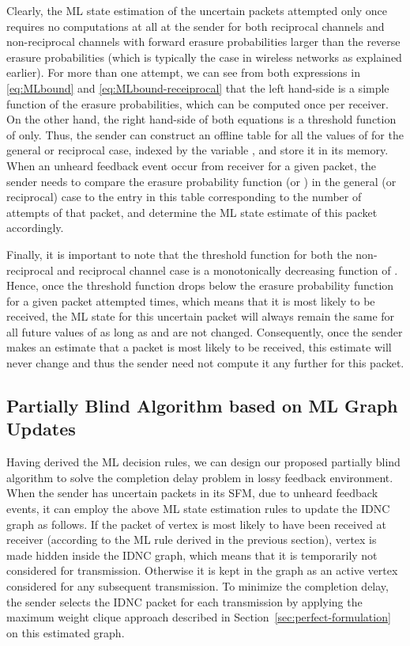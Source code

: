 \documentclass[10pt,jounral]{IEEEtran}
\newcommand{\sref}[1]{Section~\ref{#1}}
\newcommand{\ignore}[1]{}
\begin{document}
Clearly, the ML state estimation of the uncertain packets attempted only once requires no computations at all at the sender for both reciprocal channels and non-reciprocal channels with forward erasure probabilities larger than the reverse erasure probabilities (which is typically the case in wireless networks as explained earlier). For more than one attempt, we can see from both expressions in \eqref{eq:MLbound} and \eqref{eq:MLbound-receiprocal} that the left hand-side is a simple function of the erasure probabilities, which can be computed once per receiver. On the other hand, the right hand-side of both equations is a threshold function of  only. Thus, the sender can construct an offline table for all the values of \ignore{ } for the general or reciprocal case, indexed by the variable , and store it in its memory. When an unheard feedback event occur from receiver  for a given packet, the sender needs to compare the erasure probability function  (or ) in the general (or reciprocal) case to the entry in this table corresponding to the number of attempts of that packet, and determine the ML state estimate of this packet accordingly\ignore{to make the decision on updating the SFM and IDNC graph accordingly}.

Finally, it is important to note that the threshold function for both the non-reciprocal and reciprocal channel case is a monotonically decreasing function of . Hence, once the threshold function drops below the erasure probability function for a given packet attempted  times, which means that it is most likely to be received, the ML state for this uncertain packet will always remain the same for all future values of  as long as  and  are not changed. Consequently, once the sender makes an estimate that a packet is most likely to be received, this estimate will never change and thus the sender need not compute it any further for this packet.



\subsection{Partially Blind Algorithm based on ML Graph Updates} \label{sec:blind-update}
Having derived the ML decision rules, we can design our proposed partially blind algorithm to solve the completion delay problem in lossy feedback environment. When the sender has uncertain packets in its SFM, due to unheard feedback events, it can employ the above ML state estimation rules to update the IDNC graph as follows. If the packet  of vertex  is most likely to have been received at receiver  (according to the ML rule derived in the previous section), vertex  is made hidden inside the IDNC graph, which means that it is temporarily not considered for transmission. Otherwise it is kept in the graph as an active vertex considered for any subsequent transmission. To minimize the completion delay, the sender selects the IDNC packet for each transmission by applying the maximum weight clique approach described in \sref{sec:perfect-formulation} on this estimated graph.
\end{document}
